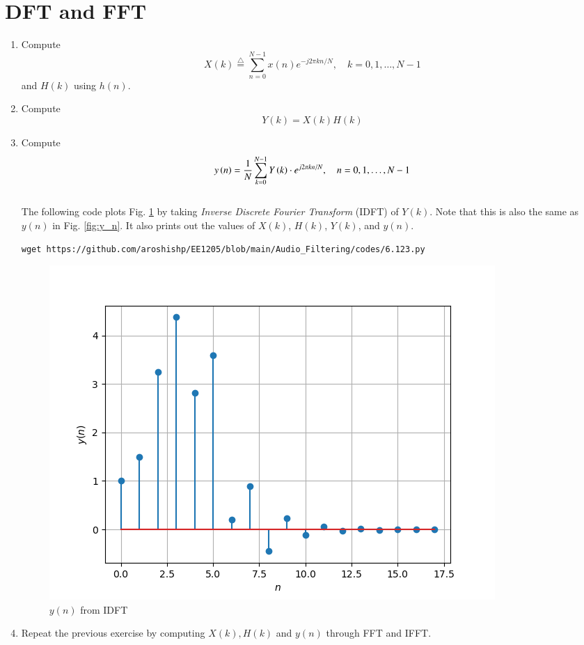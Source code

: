 \documentclass[journal,12pt,twocolumn]{IEEEtran}
\newcommand{\define}{\stackrel{\triangle}{=}}
\theoremstyle{remark}
\renewcommand\thesection{\arabic{section}}
\numberwithin{equation}{subsection}
\begin{document}
\section{DFT and FFT}
\begin{enumerate}[label=\thesection.\arabic*]
\item
Compute
\begin{equation}
X(k) \define \sum _{n=0}^{N-1}x(n) e^{-j2\pi kn/N}, \quad k = 0,1,\dots, N-1
\end{equation}
and $H(k)$ using $h(n)$.
\item Compute 
\begin{equation}
Y(k) = X(k)H(k) \label{eq:6.2}
\end{equation}
\item Compute
\begin{equation}
 y\left(n\right)={\frac {1}{N}}\sum _{k=0}^{N-1}Y\left(k\right)\cdot e^{j 2\pi kn/N},\quad n = 0,1,\dots, N-1
\end{equation}
\\
\solution The following code plots Fig. \ref{fig:yndft} by taking {\em Inverse Discrete Fourier Transform} (IDFT) of $Y(k)$. Note that this is also the same as 
$y(n)$ in  Fig. 
\ref{fig:y_n}. It also prints out the values of $X(k)$, $H(k)$, $Y(k)$, and $y(n)$.
%
\begin{lstlisting}
wget https://github.com/aroshishp/EE1205/blob/main/Audio_Filtering/codes/6.123.py
\end{lstlisting}
\begin{figure}[!ht]
\centering
\includegraphics[width=\columnwidth]{figs/6.1.png}
\caption{$y(n)$ from IDFT}
\label{fig:yndft}
\end{figure}
\newpage
\item Repeat the previous exercise by computing $X(k), H(k)$ and $y(n)$ through FFT and 
IFFT.\\


\end{enumerate}
\end{document}
